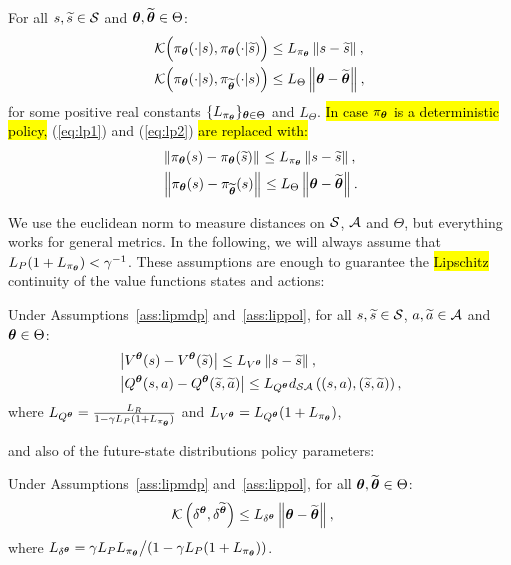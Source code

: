 %
\begin{assumption}\label{ass:lippol}
	For all $s,\widetilde{s}\in\mathcal{S}$ and $\boldsymbol{\theta},\widetilde{\boldsymbol{\theta}}\in\Theta$:
	\begin{align}
	&\mathcal{K}\Big(\pi_{\boldsymbol{\theta}}(\cdot|s),\pi_{\boldsymbol{\theta}}(\cdot|\widetilde{s})\Big) \leq L_{\pi_{\boldsymbol{\theta}}}\left\|s-\widetilde{s}\right\|_{}, \label{eq:lp1}\\
	&\mathcal{K}\Big(\pi_{\boldsymbol{\theta}}(\cdot|s), \pi_{\widetilde{\boldsymbol{\theta}}}(\cdot|s)\Big) \leq L_{\Theta}\left\|\boldsymbol{\theta}-\widetilde{\boldsymbol{\theta}}\right\|_{}, \label{eq:lp2}
	\end{align}
	for some positive real constants $\{L_{\pi_{\boldsymbol{\theta}}}\}_{\boldsymbol{\theta}\in\Theta}$ and $L_{\Theta}$. \hl{In case $\pi_{\boldsymbol{\theta}}$ is a deterministic policy,} (\ref{eq:lp1}) and (\ref{eq:lp2}) \hl{are replaced with:}
	\begin{align}
	&\left\|\pi_{\boldsymbol{\theta}}(s) - \pi_{\boldsymbol{\theta}}(\widetilde{s})\right\|_{} \leq L_{\pi_{\boldsymbol{\theta}}}\left\|s-\widetilde{s}\right\|_{}, \\
	&\left\|\pi_{\boldsymbol{\theta}}(s) - \pi_{\widetilde{\boldsymbol{\theta}}}(s)\right\|_{} \leq L_{\Theta}\left\|\boldsymbol{\theta}-\widetilde{\boldsymbol{\theta}}\right\|_{}.
	\end{align}
\end{assumption}
%
\noindent We use the euclidean norm to measure distances on $\mathcal{S}$, $\mathcal{A}$ and $\Theta$, but everything works for general metrics.
In the following, we will always assume that ${L_{P}(1+L_{\pi_{\boldsymbol{\theta}}}) < \gamma^{-1}}$.
These assumptions are enough to guarantee the \hl{Lipschitz} continuity of the value functions \wrt states and actions:
%
\begin{lemma}\label{lem:lipval}
	Under Assumptions~\ref{ass:lipmdp} and~\ref{ass:lippol}, for all $s,\widetilde{s}\in\mathcal{S}$, $a,\widetilde{a}\in\mathcal{A}$ and $\boldsymbol{\theta}\in\Theta$:
	\begin{align}
	&\left|V^{\boldsymbol{\theta}}(s) - V^{\boldsymbol{\theta}}(\widetilde{s})\right| \leq L_{V^{\boldsymbol{\theta}}}\left\|s-\widetilde{s}\right\|_{}, \\
	&\left|Q^{\boldsymbol{\theta}}(s,a) - Q^{\boldsymbol{\theta}}(\widetilde{s},\widetilde{a})\right| \leq L_{Q^{\boldsymbol{\theta}}}d_{\mathcal{S}\mathcal{A}}\left((s,a),(\widetilde{s},\widetilde{a})\right),
	\end{align}
	where $L_{Q^{\boldsymbol{\theta}}} = \frac{L_{R}}{1-\gamma L_{P}(1+L_{\pi_{\boldsymbol{\theta}}})}$ and $L_{V^{\boldsymbol{\theta}}} = L_{Q^{\boldsymbol{\theta}}}(1+L_{\pi_{\boldsymbol{\theta}}})$,
\end{lemma}
%
\noindent and also of the future-state distributions \wrt policy parameters:
%
\begin{lemma}\label{lem:lipfut}
	Under Assumptions~\ref{ass:lipmdp} and~\ref{ass:lippol}, for all $\boldsymbol{\theta},\widetilde{\boldsymbol{\theta}}\in\Theta$:
	\begin{align}
	&\mathcal{K}\left(\delta^{\boldsymbol{\theta}},\delta^{\widetilde{\boldsymbol{\theta}}}\right) \leq L_{\delta^{\boldsymbol{\theta}}}\left\|\boldsymbol{\theta}-\widetilde{\boldsymbol{\theta}}\right\|_{},
	\end{align}
	where $L_{\delta^{\boldsymbol{\theta}}} = {\gamma L_{P}L_{\pi_{\boldsymbol{\theta}}}}\big/{\left(1-\gamma L_{P}(1+L_{\pi_{\boldsymbol{\theta}}})\right)}$.
\end{lemma}

